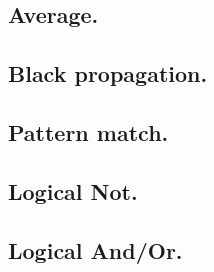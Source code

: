 \newpage
\subsection{Average.}


\newpage
\subsection{Black propagation.}


\newpage
\subsection{Pattern match.}


\newpage
\subsection{Logical Not.}


\newpage
\subsection{Logical And/Or.}



